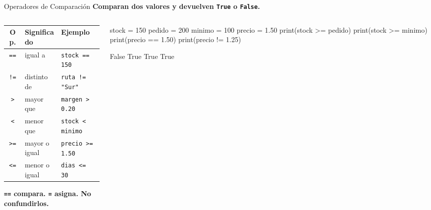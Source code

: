 \documentclass[aspectratio=169, 11pt]{beamer}
\begin{document}
\begin{frame}[fragile,shrink=30]{Operadores de Comparación}
  \vspace{-6pt}
  {\small\color{arcaDark}\bfseries
    Comparan dos valores y devuelven \texttt{True} o \texttt{False}.}

  \vspace{6pt}
  \begin{columns}[T]
    \begin{column}{0.50\textwidth}
      {\footnotesize
      \renewcommand{\arraystretch}{1.35}
      \begin{tabular}{@{}c l l@{}}
        \toprule
        {\bfseries\color{arcaDark} Op.}
        & {\bfseries\color{arcaDark} Significado}
        & {\bfseries\color{arcaDark} Ejemplo} \\
        \midrule
        \texttt{==} & igual a              & \texttt{stock == 150} \\
        \texttt{!=} & distinto de          & \texttt{ruta != "Sur"} \\
        \texttt{>}  & mayor que            & \texttt{margen > 0.20} \\
        \texttt{<}  & menor que            & \texttt{stock < minimo} \\
        \texttt{>=} & mayor o igual        & \texttt{precio >= 1.50} \\
        \texttt{<=} & menor o igual        & \texttt{dias <= 30} \\
        \bottomrule
      \end{tabular}
      }

      \vspace{6pt}
      {\scriptsize\color{arcaRed}\bfseries
        \faExclamationTriangle\hspace{4pt}
        \texttt{==} compara. \texttt{=} asigna.
        No confundirlos.}
    \end{column}

    \begin{column}{0.46\textwidth}
      \begin{pyblock}
stock  = 150
pedido = 200
minimo = 100
precio = 1.50
print(stock >= pedido)
print(stock >= minimo)
print(precio == 1.50)
print(precio != 1.25)
      \end{pyblock}
      \vspace{-2pt}
      \begin{outputblock}
False
True
True
True
      \end{outputblock}
    \end{column}
  \end{columns}
\end{frame}
\end{document}
